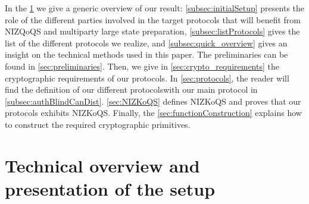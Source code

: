 In the \cref{sec:overview} we give a generic overview of our result: \cref{subsec:initialSetup} presents the role of the different parties involved in the target protocols that will benefit from NIZQoQS and multiparty large state preparation, \cref{subsec:listProtocols} gives the list of the different protocols we realize, and \cref{subsec:quick_overview} gives an insight on the technical methods used in this paper. The preliminaries can be found in \cref{sec:preliminaries}.
Then, we give in \cref{sec:crypto_requirements} the cryptographic requirements of our protocols. In \cref{sec:protocols}, the reader will find the definition of our different protocolswith our main protocol \authBlindCanDist{} in \cref{subsec:authBlindCanDist}. \cref{sec:NIZKoQS} defines NIZKoQS and proves that our protocols exhibits NIZKoQS. Finally, the \cref{sec:functionConstruction} explains how to construct the required cryptographic primitives.

\section{Technical overview and presentation of the setup}\label{sec:overview}

